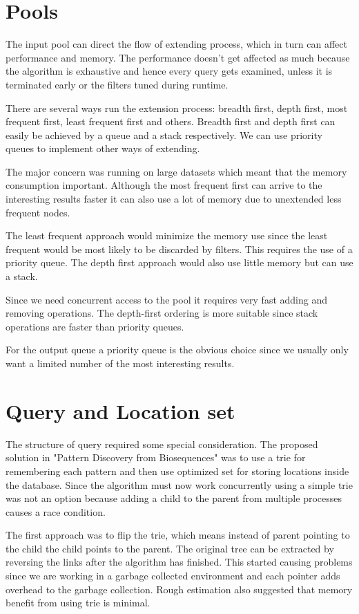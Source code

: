 \section{Pools}

The input pool can direct the flow of extending process, which in turn can affect performance and memory. The performance doesn't get affected as much because the algorithm is exhaustive and hence every query gets examined, unless it is terminated early or the filters tuned during runtime.

There are several ways run the extension process: breadth first, depth first, most frequent first, least frequent first and others. Breadth first and depth first can easily be achieved by a queue and a stack respectively. We can use priority queues to implement other ways of extending.

The major concern was running on large datasets which meant that the memory consumption important. Although the most frequent first can arrive to the interesting results faster it can also use a lot of memory due to unextended less frequent nodes.

The least frequent approach would minimize the memory use since the least frequent would be most likely to be discarded by filters. This requires the use of a priority queue. The depth first approach would also use little memory but can use a stack.

Since we need concurrent access to the pool it requires very fast adding and removing operations. The depth-first ordering is more suitable since stack operations are faster than priority queues.

For the output queue a priority queue is the obvious choice since we usually only want a limited number of the most interesting results.

\section{Query and Location set}

The structure of query required some special consideration. The proposed solution in "Pattern Discovery from Biosequences" was to use a trie for remembering each pattern and then use optimized set for storing locations inside the database. Since the algorithm must now work concurrently using a simple trie was not an option because adding a child to the parent from multiple processes causes a race condition. 

The first approach was to flip the trie, which means instead of parent pointing to the child the child points to the parent. The original tree can be extracted by reversing the links after the algorithm has finished. This started causing problems since we are working in a garbage collected environment and each pointer adds overhead to the garbage collection. Rough estimation also suggested that memory benefit from using trie is minimal.

